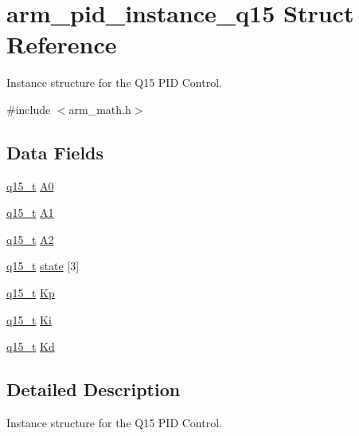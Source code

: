 \hypertarget{structarm__pid__instance__q15}{}\section{arm\+\_\+pid\+\_\+instance\+\_\+q15 Struct Reference}
\label{structarm__pid__instance__q15}


Instance structure for the Q15 P\+ID Control.  




{\ttfamily \#include $<$arm\+\_\+math.\+h$>$}

\subsection*{Data Fields}
\begin{DoxyCompactItemize}
\item 
\mbox{\hyperlink{arm__math_8h_ab5a8fb21a5b3b983d5f54f31614052ea}{q15\+\_\+t}} \mbox{\hyperlink{structarm__pid__instance__q15_a1aa73268c65cea0c7bc66bb70ff35205}{A0}}
\item 
\mbox{\hyperlink{arm__math_8h_ab5a8fb21a5b3b983d5f54f31614052ea}{q15\+\_\+t}} \mbox{\hyperlink{structarm__pid__instance__q15_af66ed2ba68c67c1cac2c37cc902bb386}{A1}}
\item 
\mbox{\hyperlink{arm__math_8h_ab5a8fb21a5b3b983d5f54f31614052ea}{q15\+\_\+t}} \mbox{\hyperlink{structarm__pid__instance__q15_a06ee5d86e97bf48a15096806b79f299c}{A2}}
\item 
\mbox{\hyperlink{arm__math_8h_ab5a8fb21a5b3b983d5f54f31614052ea}{q15\+\_\+t}} \mbox{\hyperlink{structarm__pid__instance__q15_a4c4e19d77015f5f7a31a1daf0faf31b6}{state}} \mbox{[}3\mbox{]}
\item 
\mbox{\hyperlink{arm__math_8h_ab5a8fb21a5b3b983d5f54f31614052ea}{q15\+\_\+t}} \mbox{\hyperlink{structarm__pid__instance__q15_afef61fb3b64c73f2cd0c91d9dcf95679}{Kp}}
\item 
\mbox{\hyperlink{arm__math_8h_ab5a8fb21a5b3b983d5f54f31614052ea}{q15\+\_\+t}} \mbox{\hyperlink{structarm__pid__instance__q15_a19d5059baf06dd52266260d096702d0a}{Ki}}
\item 
\mbox{\hyperlink{arm__math_8h_ab5a8fb21a5b3b983d5f54f31614052ea}{q15\+\_\+t}} \mbox{\hyperlink{structarm__pid__instance__q15_abf38d18de1e16bc6d86846fedf8534fe}{Kd}}
\end{DoxyCompactItemize}


\subsection{Detailed Description}
Instance structure for the Q15 P\+ID Control. 

